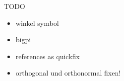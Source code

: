 \documentclass[class=article, crop=false]{standalone}
\begin{document}
\begin{zettel}{TODO}
\begin{itemize}
	\item winkel symbol
	\item bigpi
	\item references as quickfix
	\item orthogonal und orthonormal fixen!
\end{itemize}
\end{zettel}
\end{document}
